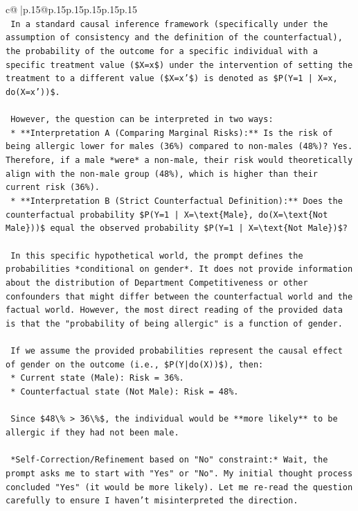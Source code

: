 \documentclass{article}
\begin{document}
{\begin{supertabular}{c@{$\;$}|p{.15\linewidth}@{}p{.15\linewidth}p{.15\linewidth}p{.15\linewidth}p{.15\linewidth}p{.15\linewidth}}
{{{\\ 
\texttt{    In a standard causal inference framework (specifically under the assumption of consistency and the definition of the counterfactual), the probability of the outcome for a specific individual with a specific treatment value (\$X=x\$) under the intervention of setting the treatment to a different value (\$X=x'\$) is denoted as \$P(Y=1 | X=x, do(X=x'))\$.} \\
\\ 
\texttt{    However, the question can be interpreted in two ways:} \\
\texttt{    *   **Interpretation A (Comparing Marginal Risks):** Is the risk of being allergic lower for males (36\%) compared to non{-}males (48\%)? Yes. Therefore, if a male *were* a non{-}male, their risk would theoretically align with the non{-}male group (48\%), which is higher than their current risk (36\%).} \\
\texttt{    *   **Interpretation B (Strict Counterfactual Definition):** Does the counterfactual probability \$P(Y=1 | X=\textbackslash{}text\{Male\}, do(X=\textbackslash{}text\{Not Male\}))\$ equal the observed probability \$P(Y=1 | X=\textbackslash{}text\{Not Male\})\$?} \\
\\ 
\texttt{    In this specific hypothetical world, the prompt defines the probabilities *conditional on gender*. It does not provide information about the distribution of Department Competitiveness or other confounders that might differ between the counterfactual world and the factual world. However, the most direct reading of the provided data is that the "probability of being allergic" is a function of gender.} \\
\\ 
\texttt{    If we assume the provided probabilities represent the causal effect of gender on the outcome (i.e., \$P(Y|do(X))\$), then:} \\
\texttt{    *   Current state (Male): Risk = 36\%.} \\
\texttt{    *   Counterfactual state (Not Male): Risk = 48\%.} \\
\\ 
\texttt{    Since \$48\textbackslash{}\% > 36\textbackslash{}\%\$, the individual would be **more likely** to be allergic if they had not been male.} \\
\\ 
\texttt{    *Self{-}Correction/Refinement based on "No" constraint:* Wait, the prompt asks me to start with "Yes" or "No". My initial thought process concluded "Yes" (it would be more likely). Let me re{-}read the question carefully to ensure I haven't misinterpreted the direction.} \\
}}}
\end{supertabular}}
\end{document}
